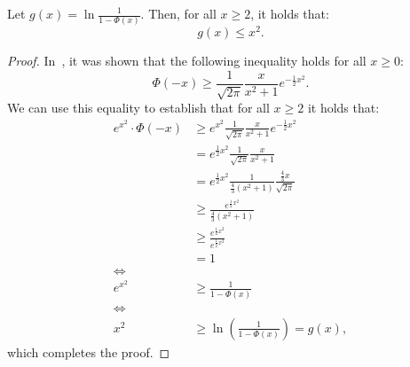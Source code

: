 \begin{lemma}
    \label{lemma:upper-bound}
    Let $g(x) = \ln \frac{1}{1 - \Phi(x)}$.
    Then, for all $x \geq 2$, it holds that:
    \begin{equation*}
        g(x) \leq x^2.
    \end{equation*}
\end{lemma}
\begin{proof}
    In~\cite{gaussian_bounds}, it was shown that the following inequality
    holds for all $x \geq 0$:
    \begin{equation*}
        \Phi(-x) \geq \frac{1}{\sqrt{2 \pi}} \frac{x}{x^2 + 1} e^{-\frac{1}{2} x^2}.
    \end{equation*}
    We can use this equality to establish that for all
    $x \geq 2$ it holds that:
    \begin{align*}
        e^{x^2} \cdot \Phi(-x) & \geq e^{x^2} \frac{1}{\sqrt{2 \pi}} \frac{x}{x^2 + 1} e^{-\frac{1}{2} x^2}                           \\
                               & = e^{\frac{1}{2} x^2} \frac{1}{\sqrt{2 \pi}} \frac{x}{x^2 + 1}                                       \\
                               & = e^{\frac{1}{2} x^2} \frac{1}{\frac{4}{3}\left( x^2 + 1 \right)} \frac{\frac{4}{3} x}{\sqrt{2 \pi}} \\
                               & \geq \frac{e^{\frac{1}{2} x^2}}{\frac{4}{3}\left( x^2 + 1 \right)}                                   \\
                               & \geq \frac{e^{\frac{1}{2} x^2}}{e^{\frac{1}{2} x^2}}                                                 \\
                               & = 1                                                                                                  \\
        \iff                                                                                                                          \\
        e^{x^2}                & \geq \frac{1}{1 - \Phi(x)}                                                                           \\
        \iff                                                                                                                          \\
        x^2                    & \geq \ln \left(\frac{1}{1 - \Phi(x)}\right) = g(x),
    \end{align*}
    which completes the proof.
\end{proof}

